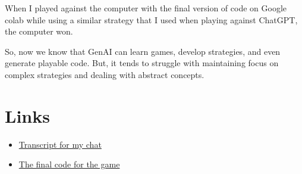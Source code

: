 \documentclass{article}
\begin{document}
When I played against the computer with the final version of code on Google colab while using a similar strategy that I used when playing against ChatGPT, the computer won.\newline

So, now we know that GenAI can learn games, develop strategies, and even generate playable code. But, it tends to struggle with maintaining focus on complex strategies and dealing with abstract concepts. \newline

\section{Links}
\begin{itemize}
    \item \href{https://chat.openai.com/share/dee4d319-f2da-48be-8f3f-cdcc8f603116}{Transcript for my chat}

    \item \href{https://colab.research.google.com/drive/13c1AyFl__FLPmxBiya7yxov_iHZq7-l7?usp=sharing}{The final code for the game}
\end{itemize}
\end{document}
